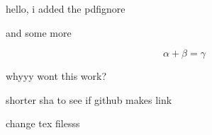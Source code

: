 \documentclass{article}
\begin{document}
hello, i added the pdfignore

and some more

$$\alpha + \beta = \gamma$$


whyyy wont this work?

shorter sha to see if github makes link

change tex filesss
\end{document}
